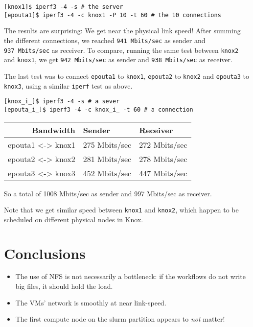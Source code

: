 \begin{verbatim}
[knox1]$ iperf3 -4 -s # the server
[epouta1]$ iperf3 -4 -c knox1 -P 10 -t 60 # the 10 connections
\end{verbatim}

The results are surprising: We get near the physical link speed! After
summing the different connections, we reached \texttt{941\ Mbits/sec} as
sender and \texttt{937\ Mbits/sec} as receiver. To compare, running the
same test between \texttt{knox2} and \texttt{knox1}, we get
\texttt{942\ Mbits/sec} as sender and \texttt{938\ Mbits/sec} as
receiver.

The last test was to connect \texttt{epouta1} to \texttt{knox1},
\texttt{epouta2} to \texttt{knox2} and \texttt{epouta3} to
\texttt{knox3}, using a similar \texttt{iperf} test as above.

\begin{verbatim}
[knox_i_]$ iperf3 -4 -s # a sever
[epouta_i_]$ iperf3 -4 -c knox_i_ -t 60 # a connection
\end{verbatim}

\begin{longtable}[]{@{}rll@{}}
\toprule
Bandwidth & Sender & Receiver\tabularnewline
\midrule
\endhead
epouta1 \textless{}-\textgreater{} knox1 & 275 Mbits/sec & 272
Mbits/sec\tabularnewline
epouta2 \textless{}-\textgreater{} knox2 & 281 Mbits/sec & 278
Mbits/sec\tabularnewline
epouta3 \textless{}-\textgreater{} knox3 & 452 Mbits/sec & 447
Mbits/sec\tabularnewline
\bottomrule
\end{longtable}

So a total of 1008 Mbits/sec as sender and 997 Mbits/sec as receiver.

Note that we get similar speed between \texttt{knox1} and
\texttt{knox2}, which happen to be scheduled on different physical nodes
in Knox.

\section{Conclusions}\label{conclusions}

\begin{itemize}
\item
  The use of NFS is not necessarily a bottleneck: if the workflows do
  not write big files, it should hold the load.
\item
  The VMs' network is smoothly at near link-speed.
\item
  The first compute node on the slurm partition appears to \emph{not}
  matter!
\end{itemize}

